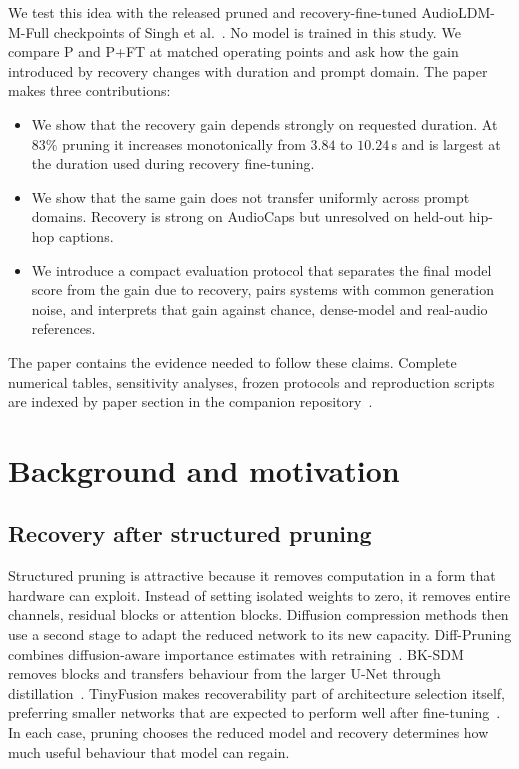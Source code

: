 \documentclass{article}
\newcommand{\PFT}{P{+}FT}
\begin{document}
We test this idea with the released pruned and recovery-fine-tuned AudioLDM-M-Full checkpoints of Singh et al.~\cite{singh2026pruning}. No model is trained in this study. We compare P and \PFT{} at matched operating points and ask how the gain introduced by recovery changes with duration and prompt domain. The paper makes three contributions:
\begin{itemize}\itemsep1.5pt \parskip0pt 
\item We show that the recovery gain depends strongly on requested duration. At $83\%$ pruning it increases monotonically from $3.84$ to $10.24$\,s and is largest at the duration used during recovery fine-tuning.
\item We show that the same gain does not transfer uniformly across prompt domains. Recovery is strong on AudioCaps but unresolved on held-out hip-hop captions.
\item We introduce a compact evaluation protocol that separates the final model score from the gain due to recovery, pairs systems with common generation noise, and interprets that gain against chance, dense-model and real-audio references.
\end{itemize}
The paper contains the evidence needed to follow these claims. Complete numerical tables, sensitivity analyses, frozen protocols and reproduction scripts are indexed by paper section in the companion repository~\cite{bibbo2026repo}.

\section{Background and motivation}
\subsection{Recovery after structured pruning}
Structured pruning is attractive because it removes computation in a form that hardware can exploit. Instead of setting isolated weights to zero, it removes entire channels, residual blocks or attention blocks. Diffusion compression methods then use a second stage to adapt the reduced network to its new capacity. Diff-Pruning combines diffusion-aware importance estimates with retraining~\cite{fang2023diffpruning}. BK-SDM removes blocks and transfers behaviour from the larger U-Net through distillation~\cite{kim2024bksdm}. TinyFusion makes recoverability part of architecture selection itself, preferring smaller networks that are expected to perform well after fine-tuning~\cite{fang2025tinyfusion}. In each case, pruning chooses the reduced model and recovery determines how much useful behaviour that model can regain.
\end{document}

